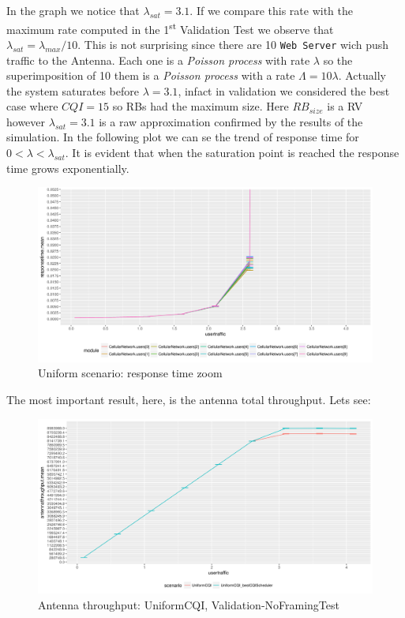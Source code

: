 In the graph we notice that \(\lambda_{sat}=3.1\). If we compare this rate with the maximum rate computed in the 1\textsuperscript{st} Validation Test we observe that \(\lambda_{sat} = \lambda_{max}/10\). This is not surprising since there are 10 \texttt{Web Server} wich push traffic to the Antenna. Each one is a \textit{Poisson process} with rate \(\lambda\) so the superimposition of 10 them is a \textit{Poisson process} with a rate \(\Lambda = 10\lambda\). Actually the system saturates before \(\lambda=3.1\), infact in validation we considered the best case where \(CQI=15\) so RBs had the maximum size. Here \(RB_{size}\) is a RV however \(\lambda_{sat}=3.1\) is a raw approximation confirmed by the results of the simulation.
In the following plot we can se the trend of response time for \(0 < \lambda < \lambda_{sat}\). It is evident that when the saturation point is reached the response time grows exponentially.
\begin{figure}[H]
  \includegraphics[width=1\textwidth]{images/allrt-unif.png}
   \caption{Uniform scenario: response time zoom}
  \label{fig:Uniform scenario: response time zoom}
\end{figure}

The most important result, here, is the antenna total throughput. Lets see:
\begin{figure}[H]
  \includegraphics[width=1\textwidth]{images/thantenna-1}
  \caption{Antenna throughput: UniformCQI, Validation-NoFramingTest}
  \label{fig:Antenna throughput: UniformCQI, Validation-NoFramingTest}
\end{figure}

